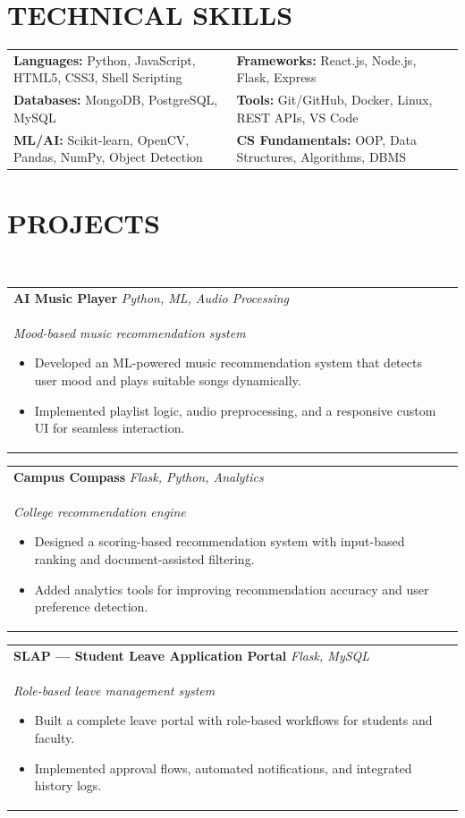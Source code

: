 \documentclass[a4paper,11pt]{article}
\newcommand{\resumeItem}[1]{\item\small{#1}}
\newcommand{\resumeItemListStart}{\begin{itemize}[leftmargin=12pt, itemsep=3pt]}
\newcommand{\resumeItemListEnd}{\end{itemize}\vspace{4pt}}
\newcommand{\projectHeading}[3]{
  \textbf{#1} \hfill {\small\textit{#2}}\\[-2pt]
  {\small\textit{#3}}
}
\begin{document}
\section{TECHNICAL SKILLS}
\begin{tabularx}{\textwidth}{@{}X X@{}}
\textbf{Languages:} Python, JavaScript, HTML5, CSS3, Shell Scripting & 
\textbf{Frameworks:} React.js, Node.js, Flask, Express \\[4pt]

\textbf{Databases:} MongoDB, PostgreSQL, MySQL &
\textbf{Tools:} Git/GitHub, Docker, Linux, REST APIs, VS Code \\[4pt]

\textbf{ML/AI:} Scikit-learn, OpenCV, Pandas, NumPy, Object Detection &
\textbf{CS Fundamentals:} OOP, Data Structures, Algorithms, DBMS \\
\end{tabularx}

\vspace{8pt}


\section{PROJECTS}


\projectHeading{}{}{}


\begin{tabularx}{\textwidth}{@{}X X@{}}

\projectHeading{ AI Music Player}{Python, ML, Audio Processing}{Mood-based music recommendation system}
\resumeItemListStart
\resumeItem{Developed an ML-powered music recommendation system that detects user mood and plays suitable songs dynamically.}
\resumeItem{Implemented playlist logic, audio preprocessing, and a responsive custom UI for seamless interaction.}
\resumeItemListEnd
\end{tabularx}


\begin{tabularx}{\textwidth}{@{}X X@{}}
\projectHeading{Campus Compass}{Flask, Python, Analytics}{College recommendation engine}
\resumeItemListStart
\resumeItem{Designed a scoring-based recommendation system with input-based ranking and document-assisted filtering.}
\resumeItem{Added analytics tools for improving recommendation accuracy and user preference detection.}
\resumeItemListEnd
\end{tabularx}


\begin{tabularx}{\textwidth}{@{}X X@{}}
\projectHeading{SLAP — Student Leave Application Portal}{Flask, MySQL}{Role-based leave management system}
\resumeItemListStart
\resumeItem{Built a complete leave portal with role-based workflows for students and faculty.}
\resumeItem{Implemented approval flows, automated notifications, and integrated history logs.}
\resumeItemListEnd
\end{tabularx}
\end{document}
